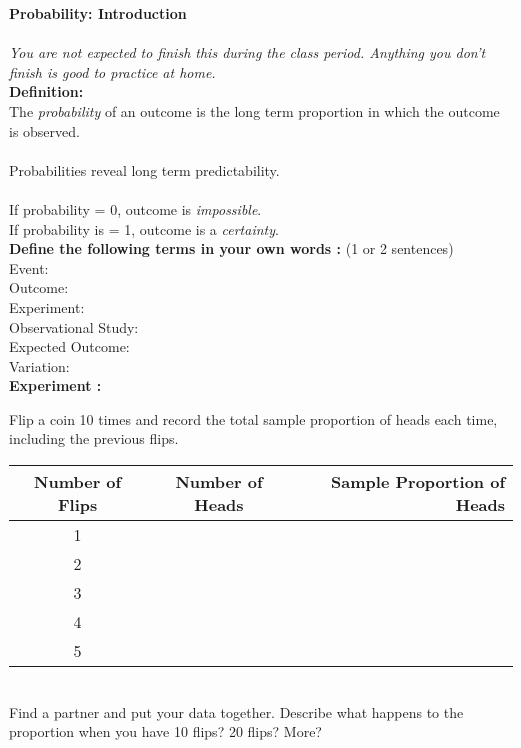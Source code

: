 \documentclass[12pt]{article}
\begin{document}
 \textbf{Probability: Introduction} \\
\\
\textit{You are not expected to finish this during the class period. Anything you don't finish is good to practice at home.}  \\ [5pt]

\textbf{Definition:} \\ [5pt]

 The \textit{probability} of an outcome is the long term proportion in which the outcome is observed. \\
\\
Probabilities reveal long term predictability. \\
\\
If probability = 0, outcome is \textit{impossible}. \\
If probability is = 1, outcome is a \textit{certainty}. \\ 

\textbf{Define the following terms in your own words :} (1 or 2 sentences) \\ [5pt]
Event:\\  [12pt]
Outcome: \\ [12pt]
Experiment:\\ [12pt]
Observational Study: \\ [12pt]
Expected Outcome:\\ [12pt]
Variation:\\

 \textbf{Experiment :}

 Flip a coin 10 times and record the total sample proportion of heads each time, including the previous flips.\\

\begin{tabular}{| c | c | r |}
 \hline 
Number of Flips & Number of Heads & Sample Proportion of Heads \\  \hline 
1 &  & \\  [12pt] \hline 
2 & & \\  [12pt]  \hline 
3 & & \\ [12pt]  \hline 
4 & & \\  [12pt]  \hline 
5 & & \\  [12pt]  \hline 
\end{tabular}  
\\
Find a partner and put your data together. Describe what happens to the proportion when you have 10 flips? 20 flips? More?\\
\vspace{5em}
\\
\end{document}
